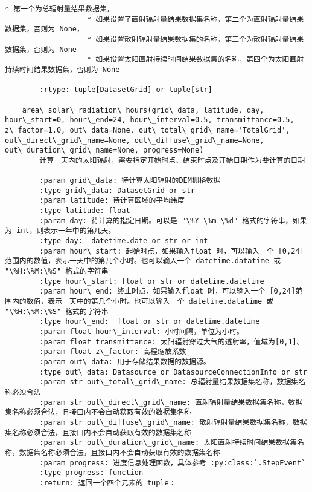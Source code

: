 \documentclass[11pt]{article}
\begin{document}
\begin{Verbatim}[commandchars=\\\{\}]
                   * 第一个为总辐射量结果数据集，
                   * 如果设置了直射辐射量结果数据集名称，第二个为直射辐射量结果数据集，否则为 None，
                   * 如果设置散射辐射量结果数据集的名称，第三个为散射辐射量结果数据集，否则为 None
                   * 如果设置太阳直射持续时间结果数据集的名称，第四个为太阳直射持续时间结果数据集，否则为 None
        
        :rtype: tuple[DatasetGrid] or tuple[str]
    
    area\_solar\_radiation\_hours(grid\_data, latitude, day, hour\_start=0, hour\_end=24, hour\_interval=0.5, transmittance=0.5, z\_factor=1.0, out\_data=None, out\_total\_grid\_name='TotalGrid', out\_direct\_grid\_name=None, out\_diffuse\_grid\_name=None, out\_duration\_grid\_name=None, progress=None)
        计算一天内的太阳辐射，需要指定开始时点、结束时点及开始日期作为要计算的日期
        
        :param grid\_data: 待计算太阳辐射的DEM栅格数据
        :type grid\_data: DatasetGrid or str
        :param latitude: 待计算区域的平均纬度
        :type latitude: float
        :param day: 待计算的指定日期。可以是 "\%Y-\%m-\%d" 格式的字符串，如果为 int，则表示一年中的第几天。
        :type day:  datetime.date or str or int
        :param hour\_start: 起始时点，如果输入float 时，可以输入一个 [0,24]范围内的数值，表示一天中的第几个小时。也可以输入一个 datetime.datatime 或 "\%H:\%M:\%S" 格式的字符串
        :type hour\_start: float or str or datetime.datetime
        :param hour\_end: 终止时点，如果输入float 时，可以输入一个 [0,24]范围内的数值，表示一天中的第几个小时。也可以输入一个 datetime.datatime 或 "\%H:\%M:\%S" 格式的字符串
        :type hour\_end:  float or str or datetime.datetime
        :param float hour\_interval: 小时间隔，单位为小时。
        :param float transmittance: 太阳辐射穿过大气的透射率，值域为[0,1]。
        :param float z\_factor: 高程缩放系数
        :param out\_data: 用于存储结果数据的数据源。
        :type out\_data: Datasource or DatasourceConnectionInfo or str
        :param str out\_total\_grid\_name: 总辐射量结果数据集名称，数据集名称必须合法
        :param str out\_direct\_grid\_name: 直射辐射量结果数据集名称，数据集名称必须合法，且接口内不会自动获取有效的数据集名称
        :param str out\_diffuse\_grid\_name: 散射辐射量结果数据集名称，数据集名称必须合法，且接口内不会自动获取有效的数据集名称
        :param str out\_duration\_grid\_name: 太阳直射持续时间结果数据集名称，数据集名称必须合法，且接口内不会自动获取有效的数据集名称
        :param progress: 进度信息处理函数，具体参考 :py:class:`.StepEvent`
        :type progress: function
        :return: 返回一个四个元素的 tuple：
        

\end{Verbatim}
\end{document}
